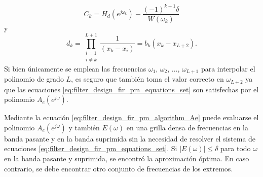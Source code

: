\documentclass[a4paper]{report}
\begin{document}
\begin{equation}\label{eq:filter_design_fir_pm_algorithm_Ck}
 C_k=H_d(e^{j\omega_k})-\frac{(-1)^{k+1}\delta}{W(\omega_k)}
\end{equation}
y
\begin{equation}\label{eq:filter_design_fir_pm_algorithm_dk}
 d_k=\prod_{\substack{i=1\\i\neq k}}^{L+1}\frac{1}{(x_k-x_i)}=b_k(x_k-x_{L+2}).
\end{equation}
Si bien únicamente se emplean las frecuencias \(\omega_1,\,\omega_2,\,\dots,\,\omega_{L+1}\) para interpolar el polinomio de grado \(L\), es seguro que también toma el valor correcto en \(\omega_{L+2}\) ya que las ecuaciones \ref{eq:filter_design_fir_pm_equations_set} son satisfechas por el polinomio \(A_e(e^{j\omega})\).

Mediante la ecuación \ref{eq:filter_design_fir_pm_algorithm_Ae} puede evaluarse el polinomio \(A_e(e^{j\omega})\) y también \(E(\omega)\) en una grilla densa de frecuencias en la banda pasante y en la banda suprimida sin la necesidad de resolver el sistema de ecuaciones \ref{eq:filter_design_fir_pm_equations_set}. Si \(|E(\omega)|\leq\delta\) para todo \(\omega\) en la banda pasante y suprimida, se encontró la aproximación óptima. En caso contrario, se debe encontrar otro conjunto de frecuencias de los extremos.
\end{document}
